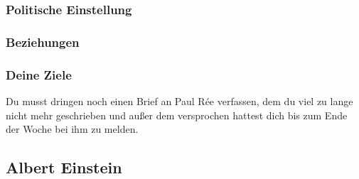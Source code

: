 \documentclass[12pt, a4paper, openany]{report}
\begin{document}
\subsubsection{Politische Einstellung}
\subsubsection{Beziehungen}
\subsubsection{Deine Ziele}
Du musst dringen noch einen Brief an Paul Rée verfassen, dem du viel zu lange nicht mehr geschrieben und außer dem versprochen hattest dich bis zum Ende der Woche bei ihm zu melden. 

\newpage


\subsection{Albert Einstein}
\end{document}
